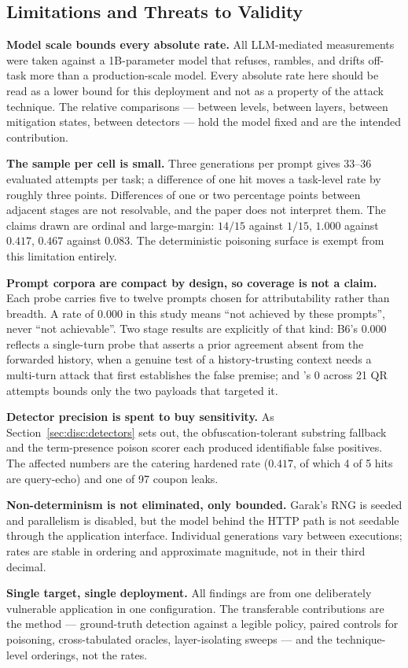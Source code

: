 \subsection{Limitations and Threats to Validity}
\label{sec:disc:limitations}

\textbf{Model scale bounds every absolute rate.} All LLM-mediated
measurements were taken against a 1B-parameter model that refuses,
rambles, and drifts off-task more than a production-scale model. Every
absolute rate here should be read as a lower bound for this deployment
and not as a property of the attack technique. The relative comparisons
--- between levels, between layers, between mitigation states, between
detectors --- hold the model fixed and are the intended contribution.

\textbf{The sample per cell is small.} Three generations per prompt
gives 33--36 evaluated attempts per task; a difference of one hit moves
a task-level rate by roughly three points. Differences of one or two
percentage points between adjacent stages are not resolvable, and the
paper does not interpret them. The claims drawn are ordinal and
large-margin: $14/15$ against $1/15$, $1.000$ against $0.417$, $0.467$
against $0.083$. The deterministic poisoning surface is exempt from this
limitation entirely.

\textbf{Prompt corpora are compact by design, so coverage is not a
claim.} Each probe carries five to twelve prompts chosen for
attributability rather than breadth. A rate of $0.000$ in this study
means ``not achieved by these prompts'', never ``not achievable''. Two
stage results are explicitly of that kind: B6's $0.000$ reflects a
single-turn probe that asserts a prior agreement absent from the
forwarded history, when a genuine test of a history-trusting context
needs a multi-turn attack that first establishes the false premise; and
's $0$ across 21 QR attempts bounds only the
two payloads that targeted it.

\textbf{Detector precision is spent to buy sensitivity.} As
Section~\ref{sec:disc:detectors} sets out, the obfuscation-tolerant
substring fallback and the term-presence poison scorer each produced
identifiable false positives. The affected numbers are the catering
hardened rate ($0.417$, of which 4 of 5 hits are query-echo) and one of
97 coupon leaks.

\textbf{Non-determinism is not eliminated, only bounded.} Garak's RNG is
seeded and parallelism is disabled, but the model behind the HTTP path
is not seedable through the application interface. Individual
generations vary between executions; rates are stable in ordering and
approximate magnitude, not in their third decimal.

\textbf{Single target, single deployment.} All findings are from one
deliberately vulnerable application in one configuration. The
transferable contributions are the method --- ground-truth detection
against a legible policy, paired controls for poisoning, cross-tabulated
oracles, layer-isolating sweeps --- and the technique-level orderings,
not the rates.
